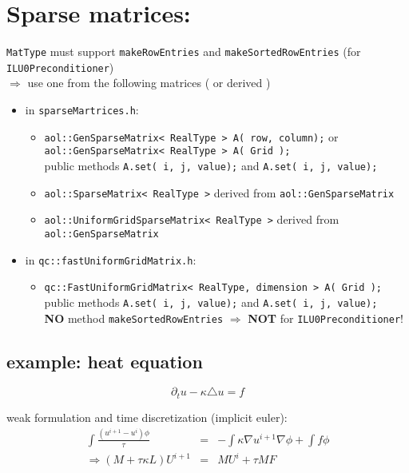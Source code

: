 
\section {Sparse matrices: }
\texttt{MatType} must support \texttt{makeRowEntries} and \texttt{makeSortedRowEntries} (for \texttt{ILU0Preconditioner})\\
$\Rightarrow$ use one from the following matrices ( or derived )
\begin{itemize}
\item in \texttt{sparseMartrices.h}:
\begin{itemize}
\item \texttt{aol::GenSparseMatrix< RealType > A( row, column);} or \\ \texttt{aol::GenSparseMatrix< RealType > A( Grid );}\\
public methods \texttt{A.set( i, j, value);} and \texttt{A.set( i, j, value);}
\item \texttt{aol::SparseMatrix< RealType >} derived from \texttt{aol::GenSparseMatrix}
\item \texttt{aol::UniformGridSparseMatrix< RealType >} derived from \texttt{aol::GenSparseMatrix}
\end{itemize}
\item in \texttt{qc::fastUniformGridMatrix.h}:
\begin{itemize}
\item \texttt{qc::FastUniformGridMatrix< RealType, dimension > A( Grid );} \\
public methods \texttt{A.set( i, j, value);} and \texttt{A.set( i, j, value);}\\
\textbf{NO} method \texttt{makeSortedRowEntries} $\Rightarrow$ \textbf{NOT} for \texttt{ILU0Preconditioner}!
\end{itemize}
\end{itemize}


\subsection{ example: heat equation }

\[ \partial_t u - \kappa \triangle u = f \]

weak formulation and time discretization (implicit euler):
\begin{eqnarray*} \int \frac{ \left(u^{i+1} - u^i\right) \phi}{\tau} & = & - \int \kappa \nabla u^{i+1} \nabla \phi + \int f \phi \\
\Rightarrow (M + \tau \kappa L) U^{i+1} & = & M U^i + \tau M F
\end{eqnarray*}

